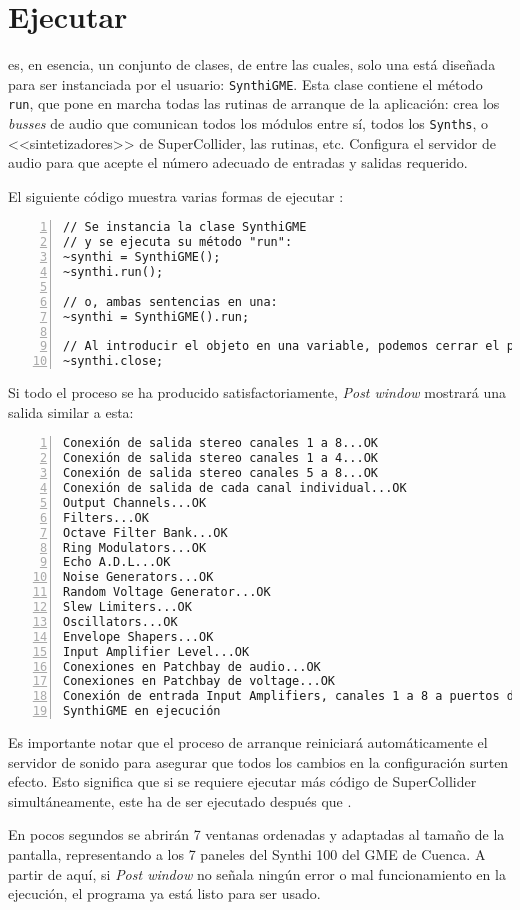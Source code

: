 \section{Ejecutar \appName}

\appName es, en esencia, un conjunto de clases, de entre las cuales, solo una está diseñada para ser instanciada por el usuario: \texttt{SynthiGME}. Esta clase contiene el método \texttt{run}, que pone en marcha todas las rutinas de arranque de la aplicación: crea los \textit{busses} de audio que comunican todos los módulos entre sí, todos los \texttt{Synths}, o <<sintetizadores>> de SuperCollider, las rutinas, etc. Configura el servidor de audio para que acepte el número adecuado de entradas y salidas requerido.

El siguiente código muestra varias formas de ejecutar \appName:
\begin{lstlisting}[style=SuperCollider-IDE, frame=single,  numbers=left]
// Se instancia la clase SynthiGME
// y se ejecuta su método "run":
~synthi = SynthiGME();
~synthi.run();

// o, ambas sentencias en una:
~synthi = SynthiGME().run;

// Al introducir el objeto en una variable, podemos cerrar el programa ejecutando el método "close":
~synthi.close;
\end{lstlisting}

Si todo el proceso se ha producido satisfactoriamente, \textit{Post window} mostrará una salida similar a esta:

\begin{lstlisting}[frame=single, numbers=left]
Conexión de salida stereo canales 1 a 8...OK
Conexión de salida stereo canales 1 a 4...OK
Conexión de salida stereo canales 5 a 8...OK
Conexión de salida de cada canal individual...OK
Output Channels...OK
Filters...OK
Octave Filter Bank...OK
Ring Modulators...OK
Echo A.D.L...OK
Noise Generators...OK
Random Voltage Generator...OK
Slew Limiters...OK
Oscillators...OK
Envelope Shapers...OK
Input Amplifier Level...OK
Conexiones en Patchbay de audio...OK
Conexiones en Patchbay de voltage...OK
Conexión de entrada Input Amplifiers, canales 1 a 8 a puertos de SC...OK
SynthiGME en ejecución
\end{lstlisting}



Es importante notar que el proceso de arranque reiniciará automáticamente el servidor de sonido para asegurar que todos los cambios en la configuración surten efecto. Esto significa que si se requiere ejecutar más código de SuperCollider simultáneamente, este ha de ser ejecutado después que \appName. 

En pocos segundos se abrirán 7 ventanas ordenadas y adaptadas al tamaño de la pantalla, representando a los 7 paneles del Synthi 100 del GME de Cuenca. A partir de aquí, si \textit{Post window} no señala ningún error o mal funcionamiento en la ejecución, el programa ya está listo para ser usado.




